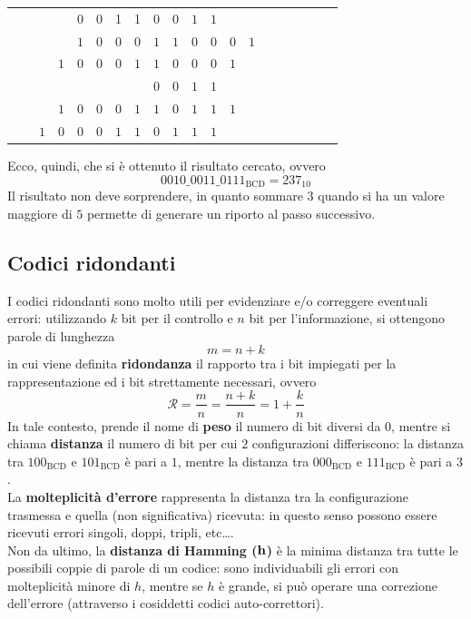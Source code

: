 \documentclass[a4paper]{extarticle}
\begin{document}
\begin{table}[H]
\begin{tabular}{|cccc|cccc|cccc|cccccccc}
    &&&&\cellcolor{cyan!25!white}0&\cellcolor{cyan!25!white}0&\cellcolor{cyan!25!white}1&\cellcolor{cyan!25!white}1&\cellcolor{cyan!25!white}$0$&\cellcolor{cyan!25!white}$0$&\cellcolor{cyan!25!white}$1$&\cellcolor{cyan!25!white}$1$&$ $&$ $&$ $&$ $&$ $&&&\\
    &&&&$1$&$0$&$0$&$0$&$1$&$1$&$0$&$0$&$0$&$1$&&&&&&\\
    &&&$1$&$0$&$0$&$0$&$1$&\cellcolor{cyan!25!white}$1$&\cellcolor{cyan!25!white}$0$&\cellcolor{cyan!25!white}$0$&\cellcolor{cyan!25!white}$0$&$1$&&&&&\\
    &&&&&&&&\cellcolor{cyan!25!white}$0$&\cellcolor{cyan!25!white}$0$&\cellcolor{cyan!25!white}$1$&\cellcolor{cyan!25!white}$1$&$ $&$ $&$ $&$ $&$ $&&&\\
    &&&$1$&$0$&$0$&$0$&$1$&$1$&$0$&$1$&$1$&$1$&&&&&\\
    &&$1$&$0$&$0$&$0$&$1$&$1$&$0$&$1$&$1$&$1$&&&&&&\\
\end{tabular}
\end{table}

\vspace{1em}
\noindent
Ecco, quindi, che si è ottenuto il risultato cercato, ovvero
\[0010\_0011\_0111_\text{BCD}=237_{10}\]
Il risultato non deve sorprendere, in quanto sommare $3$ quando si ha un valore maggiore di $5$ permette di generare un riporto al passo successivo.

\vspace{1em}
\noindent
\subsection{Codici ridondanti}
I codici ridondanti sono molto utili per evidenziare e/o correggere eventuali errori: utilizzando $k$ bit per il controllo e $n$ bit per l'informazione, si ottengono parole di lunghezza
\[m = n + k\]
in cui viene definita \textbf{ridondanza} il rapporto tra i bit impiegati per la rappresentazione ed i bit strettamente necessari, ovvero
\[\mathcal{R}=\frac{m}{n}=\frac{n+k}{n}=1+\frac{k}{n}\]
In tale contesto, prende il nome di \textbf{peso} il numero di bit diversi da $0$, mentre si chiama \textbf{distanza} il numero di bit per cui $2$ configurazioni differiscono: la distanza tra $100_\text{BCD}$ e $101_\text{BCD}$ è pari a $1$, mentre la distanza tra $000_\text{BCD}$ e $111_\text{BCD}$ è pari a $3$.\\
La \textbf{molteplicità d'errore} rappresenta la distanza tra la configurazione trasmessa e quella (non significativa) ricevuta: in questo senso possono essere ricevuti errori singoli, doppi, tripli, etc\dots.\\
Non da ultimo, la \textbf{distanza di Hamming ($\bf{h}$)} è la minima distanza tra tutte le possibili coppie di parole di un codice: sono individuabili gli errori con molteplicità minore di $h$, mentre se $h$ è grande, si può operare una correzione dell'errore (attraverso i cosiddetti codici auto-correttori).
\end{document}

